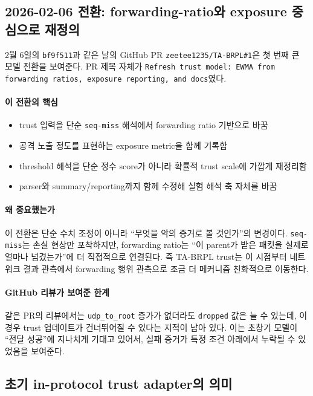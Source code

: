 \documentclass[12pt,a4paper]{article}
\begin{document}
\subsection{2026-02-06 전환: forwarding-ratio와 exposure 중심으로 재정의}

2월 6일의 \texttt{bf9f511}과 같은 날의 GitHub PR
\texttt{zeetee1235/TA-BRPL\#1}은 첫 번째 큰 모델 전환을 보여준다.
PR 제목 자체가
\texttt{Refresh trust model: EWMA from forwarding ratios, exposure reporting, and docs}였다.

\paragraph{이 전환의 핵심}
\begin{itemize}[leftmargin=1.5em]
\item trust 입력을 단순 \texttt{seq-miss} 해석에서 forwarding ratio 기반으로 바꿈
\item 공격 노출 정도를 표현하는 exposure metric을 함께 기록함
\item threshold 해석을 단순 정수 score가 아니라 확률적 trust scale에 가깝게 재정리함
\item parser와 summary/reporting까지 함께 수정해 실험 해석 축 자체를 바꿈
\end{itemize}

\paragraph{왜 중요했는가}
이 전환은 단순 수치 조정이 아니라 ``무엇을 악의 증거로 볼 것인가''의 변경이다.
\texttt{seq-miss}는 손실 현상만 포착하지만, forwarding ratio는
``이 parent가 받은 패킷을 실제로 얼마나 넘겼는가''에 더 직접적으로 연결된다.
즉 TA-BRPL trust는 이 시점부터 네트워크 결과 관측에서 forwarding 행위 관측으로
조금 더 메커니즘 친화적으로 이동한다.

\paragraph{GitHub 리뷰가 보여준 한계}
같은 PR의 리뷰에서는 \texttt{udp\_to\_root} 증가가 없더라도
\texttt{dropped} 값은 늘 수 있는데, 이 경우 trust 업데이트가 건너뛰어질 수 있다는
지적이 남아 있다. 이는 초창기 모델이 ``전달 성공''에 지나치게 기대고 있어서,
실패 증거가 특정 조건 아래에서 누락될 수 있었음을 보여준다.

\subsection{초기 in-protocol trust adapter의 의미}
\end{document}
